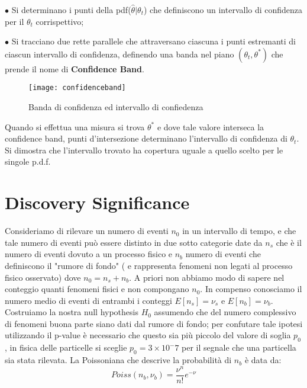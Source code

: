 \noindent $\bullet$ Si determinano i punti della pdf($\hat{\theta} \vert \theta_t$) che definiscono un intervallo di confidenza per il $\theta_t$ corrispettivo;\newline

\noindent $\bullet$ Si tracciano due rette parallele che attraversano ciascuna i punti estremanti di ciascun intervallo di confidenza, definendo una banda nel piano $(\theta_t,\theta^*)$ che prende il nome di \textbf{Confidence Band}.
\begin{figure}[ht]
\vspace{0.2in}
\texttt{[image: confidenceband]}	
\centering
\caption{Banda di confidenza ed intervallo di confiedenza}
\end{figure}

\noindent Quando si effettua una misura si trova $\theta^*$ e dove tale valore interseca la confidence band, punti
d'intersezione determinano l'intervallo di confidenza di $\theta_t$. Si dimostra che l'intervallo trovato ha copertura uguale a quello scelto per le singole p.d.f.


\section{Discovery Significance}

Consideriamo di rilevare un numero di eventi $n_0$ in un intervallo di tempo, e che tale numero di eventi pu\`{o} essere distinto in due sotto categorie date da $n_s$ che \`{e} il numero di eventi dovuto a un processo fisico e $n_b$ numero di eventi che definiscono il "rumore di fondo" ( e rappresenta fenomeni non legati al processo fisico osservato) dove $n_0 = n_s + n_b$. A priori non abbiamo modo di sapere nel conteggio quanti fenomeni fisici e non compongano $n_0$. In compenso conosciamo il numero medio di eventi di entrambi i conteggi $E[n_s] = \nu_s$ e $E[n_b] = \nu_b$. \newline
Costruiamo la nostra null hypothesis $H_0$ assumendo che del numero complessivo di fenomeni buona parte siano dati dal rumore di fondo; per confutare tale ipotesi utilizzando il p-value \`{e} necessario che questo sia pi\`{u} piccolo del valore di soglia $p_0$, in fisica delle particelle si sceglie $p_0 = 3 \times 10^-7$ per il segnale che una particella sia stata rilevata. La Poissoniana che  descrive la probabilit\`{a} di $n_b$ \`{e} data da:
\begin{equation*}
	Poiss(n_b,\nu_b) = \dfrac{\nu^n}{n!}e^{-\nu}
\end{equation*} 

